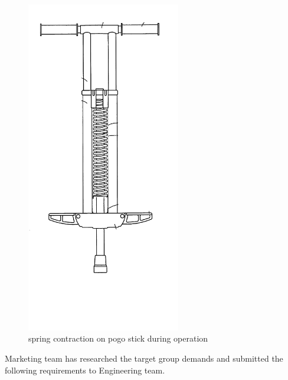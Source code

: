 \documentclass[
10pt,
a4paper,
openany,
svgnames,
]{book}
\begin{document}
\begin{exercises}
\begin{figure}[H]
\begin{minipage}[b]{0.4\textwidth}
      \includegraphics[width=0.6\textwidth]{pictures/Machine-interaction/pogostick-compress}
      \caption{spring contraction on pogo stick during operation}
      \label{fig4}
    \end{minipage}
  \end{figure}
  
  Marketing team has researched the target group demands and
  submitted the following requirements to Engineering team.
  

\end{exercises}
\end{document}
